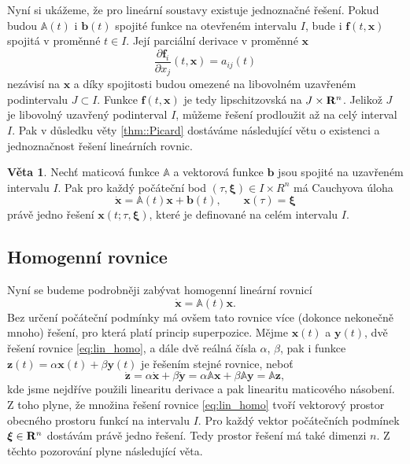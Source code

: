 \documentclass[a4paper, 12pt]{book}
\theoremstyle{definition}
\newtheorem{theorem}{Věta}[section]
\def\Real{{\rm\bf R}}
\def\vc#1{\mathbf{\boldsymbol{#1}}}     %
\def\tn#1{{\mathbb{#1}}}    %
\def\prtl{\partial}                                        %
\begin{document}
Nyní si ukážeme, že pro lineární soustavy existuje jednoznačné řešení. 
Pokud budou $\tn A(t)$ i $\vc b(t)$ spojité funkce na otevřeném intervalu $I$, bude i $\vc f(t, \vc x)$ 
spojitá v proměnné $t\in I$. Její parciální derivace v proměnné $\vc x$
\[
  \frac{\prtl\vc f_i}{\prtl x_j}(t,\vc x) = a_{ij}(t)
\]
nezávisí na $\vc x$ a díky spojitosti budou omezené na libovolném uzavřeném podintervalu $J\subset I$. Funkce $\vc f(t,\vc x)$ je tedy lipschitzovská na $J\times \Real^n$.
Jelikož $J$ je libovolný uzavřený podinterval $I$, můžeme řešení prodloužit až na celý interval $I$.
Pak v důsledku věty \ref{thm::Picard} dostáváme následující větu o existenci a jednoznačnost řešení lineárních rovnic.

\begin{theorem}
Nechť maticová funkce $\tn A$ a vektorová funkce $\vc b$ jsou spojité na 
uzavřeném intervalu $I$. Pak pro každý počáteční bod $(\tau,\vc\xi)\in I\times R^n$ má
Cauchyova úloha
\begin{equation}
\dot {\vc x}={\tn A}(t)\vc x+{\vc b}(t),\qquad \vc x(\tau)=\vc\xi
\end{equation}
právě jedno řešení $\vc x(t;\tau,\vc\xi)$, které je definované na celém 
intervalu $I$.
\end{theorem}

\subsection{Homogenní rovnice}
Nyní se budeme podrobněji zabývat homogenní lineární rovnicí
\begin{equation}
    \label{eq:lin_homo}
    \dot{\vc x}={\tn A}(t)\vc x.
\end{equation}
Bez určení počáteční podmínky má ovšem tato rovnice více (dokonce nekonečně mnoho) řešení, pro která platí princip superpozice.
Mějme $\vc x(t)$ a $\vc y(t)$, dvě řešení rovnice \eqref{eq:lin_homo}, a dále dvě reálná čísla $\alpha$, $\beta$, 
pak i funkce $\vc z(t)=\alpha\vc x(t) + \beta\vc y(t)$ je 
řešením stejné rovnice, neboť
\[
   \dot{\vc z} = \alpha\dot{\vc x} + \beta\dot{\vc y} = \alpha\tn A \vc x  +  \beta \tn A \vc y  = \tn A \vc z,
\]
kde jsme nejdříve použili linearitu derivace a pak linearitu maticového násobení. Z toho plyne, že množina řešení rovnice \eqref{eq:lin_homo}
tvoří vektorový prostor obecného prostoru funkcí na intervalu $I$. Pro každý vektor počátečních podmínek $\vc \xi \in \Real^n$ dostávám právě jedno řešení.
Tedy prostor řešení má také dimenzi $n$. Z těchto pozorování plyne následující věta.
\end{document}
